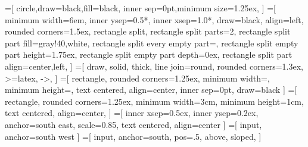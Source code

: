 =[%
    circle,draw=black,fill=black,%
    inner sep=0pt,minimum size=1.25ex,%
]%
=[%
    minimum width=6em,%
    inner ysep=0.5*\inndist,%
    inner xsep=1.0*\inndist,%
    draw=black,%
    align=left,%
    rounded corners=1.5ex,%
    rectangle split,%
    rectangle split parts=2,%
    rectangle split part fill={gray!40,white},%
    rectangle split every empty part={},%
    rectangle split empty part height=1.75ex,%
    rectangle split empty part depth=0ex,%
    rectangle split part align={center,left},%
]%
=[%
    draw,%
    solid,%
    thick,%
    line join=round,%
    rounded corners=1.3ex,%
    >=latex,%
    ->,%
]%
%
%
%
\let\procwidth\undefined%
\newlength\procwidth%
\settowidth{\procwidth}{\textbf{Forwarding Path}}%
\setlength\procwidth{\procwidth+\inndist+\inndist+1em}%
\setlength\procwidth{6em}%
%
\let\procheight\undefined%
\newlength\procheight%
%
\setlength\procheight{1.75\baselineskip}%
%
\newcommand\roundcorneramount{1.25ex}%
=[%
	rectangle,%
	rounded corners=\roundcorneramount,%
	minimum width=\procwidth,%
	minimum height=\procheight,%
	text centered,%
	align=center,%
	inner sep=0pt,%
	draw=black%
]%
=[%
	rectangle,%
	rounded corners=\roundcorneramount,%
	minimum width=3cm,%
	minimum height=1cm,%
	text centered,%
	align=center,%
]%
=[%
	inner xsep=0.5ex,%
	inner ysep=0.2ex,%
    anchor=south east,%
    scale=0.85,%
	text centered,%
	align=center%
]%
=[%
    input,%
    anchor=south west%
]%
=[%
    input,%
    anchor=south,%
    pos=.5,%
    above,%
    sloped,%
]%